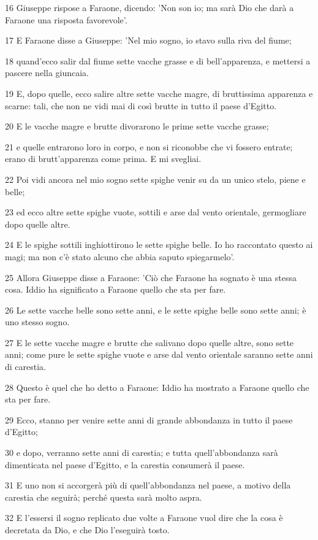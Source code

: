 \par 16 Giuseppe rispose a Faraone, dicendo: 'Non son io; ma sarà Dio che darà a Faraone una risposta favorevole'.
\par 17 E Faraone disse a Giuseppe: 'Nel mio sogno, io stavo sulla riva del fiume;
\par 18 quand'ecco salir dal fiume sette vacche grasse e di bell'apparenza, e mettersi a pascere nella giuncaia.
\par 19 E, dopo quelle, ecco salire altre sette vacche magre, di bruttissima apparenza e scarne: tali, che non ne vidi mai di così brutte in tutto il paese d'Egitto.
\par 20 E le vacche magre e brutte divorarono le prime sette vacche grasse;
\par 21 e quelle entrarono loro in corpo, e non si riconobbe che vi fossero entrate; erano di brutt'apparenza come prima. E mi svegliai.
\par 22 Poi vidi ancora nel mio sogno sette spighe venir su da un unico stelo, piene e belle;
\par 23 ed ecco altre sette spighe vuote, sottili e arse dal vento orientale, germogliare dopo quelle altre.
\par 24 E le spighe sottili inghiottirono le sette spighe belle. Io ho raccontato questo ai magi; ma non c'è stato alcuno che abbia saputo spiegarmelo'.
\par 25 Allora Giuseppe disse a Faraone: 'Ciò che Faraone ha sognato è una stessa cosa. Iddio ha significato a Faraone quello che sta per fare.
\par 26 Le sette vacche belle sono sette anni, e le sette spighe belle sono sette anni; è uno stesso sogno.
\par 27 E le sette vacche magre e brutte che salivano dopo quelle altre, sono sette anni; come pure le sette spighe vuote e arse dal vento orientale saranno sette anni di carestia.
\par 28 Questo è quel che ho detto a Faraone: Iddio ha mostrato a Faraone quello che sta per fare.
\par 29 Ecco, stanno per venire sette anni di grande abbondanza in tutto il paese d'Egitto;
\par 30 e dopo, verranno sette anni di carestia; e tutta quell'abbondanza sarà dimenticata nel paese d'Egitto, e la carestia consumerà il paese.
\par 31 E uno non si accorgerà più di quell'abbondanza nel paese, a motivo della carestia che seguirà; perché questa sarà molto aspra.
\par 32 E l'essersi il sogno replicato due volte a Faraone vuol dire che la cosa è decretata da Dio, e che Dio l'eseguirà tosto.
